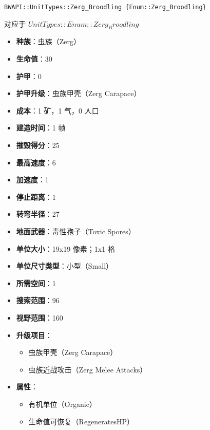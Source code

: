 \begin{tcolorbox}[colback=white, colframe=black!60!white, title=Zerg\_Broodling(), arc=0mm]
    \begin{verbatim}
BWAPI::UnitTypes::Zerg_Broodling {Enum::Zerg_Broodling}
    \end{verbatim}
    对应于  $ UnitTypes::Enum::Zerg_Broodling $ 
    \begin{itemize}
    \item \textbf{种族}：虫族（Zerg）
    \item \textbf{生命值}：30
    \item \textbf{护甲}：0
    \item \textbf{护甲升级}：虫族甲壳（Zerg Carapace）
    \item \textbf{成本}：1 矿，1 气，0 人口
    \item \textbf{建造时间}：1 帧
    \item \textbf{摧毁得分}：25
    \item \textbf{最高速度}：6
    \item \textbf{加速度}：1
    \item \textbf{停止距离}：1
    \item \textbf{转弯半径}：27
    \item \textbf{地面武器}：毒性孢子（Toxic Spores）
    \item \textbf{单位大小}：19x19 像素；1x1 格
    \item \textbf{单位尺寸类型}：小型（Small）
    \item \textbf{所需空间}：1
    \item \textbf{搜索范围}：96
    \item \textbf{视野范围}：160
    \item \textbf{升级项目}：
        \begin{itemize}
            \item 虫族甲壳（Zerg Carapace）
            \item 虫族近战攻击（Zerg Melee Attacks）
        \end{itemize}
    \item \textbf{属性}：
        \begin{itemize}
            \item 有机单位（Organic）
            \item 生命值可恢复（RegeneratesHP）
        \end{itemize}
\end{itemize}
\end{tcolorbox}

